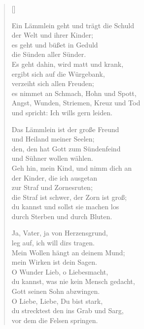 \begin{multicols}{2}
\settowidth{\versewidth}{Ein Lämmlein geht und trägt die Schuld}
\begin{verse}[\versewidth]
 
 Ein Lämmlein geht und trägt die Schuld\\
der Welt und ihrer Kinder;\\
es geht und büßet in Geduld\\
die Sünden aller Sünder.\\
Es geht dahin, wird matt und krank,\\
ergibt sich auf die Würgebank,\\
verzeiht sich allen Freuden;\\
es nimmet an Schmach, Hohn und Spott,\\
Angst, Wunden, Striemen, Kreuz und Tod\\
und spricht: Ich wills gern leiden.
 
 Das Lämmlein ist der große Freund\\
und Heiland meiner Seelen;\\
den, den hat Gott zum Sündenfeind\\
und Sühner wollen wählen.\\
\flqq Geh hin, mein Kind, und nimm dich an\\
der Kinder, die ich ausgetan\\
zur Straf und Zornesruten;\\
die Straf ist schwer, der Zorn ist groß;\\
du kannst und sollst sie machen los\\
durch Sterben und durch Bluten.\frqq
 
 \flqq Ja, Vater, ja von Herzensgrund,\\
leg auf, ich will dirs tragen.\\
Mein Wollen hängt an deinem Mund;\\
mein Wirken ist dein Sagen.\frqq\\
O Wunder Lieb, o Liebesmacht,\\%
du kannst, was nie kein Mensch gedacht,\\
Gott seinen Sohn abzwingen.\\
O Liebe, Liebe, Du bist stark,\\
du strecktest den ins Grab und Sarg,\\
vor dem die Felsen springen.
 

\end{verse}
\end{multicols}
